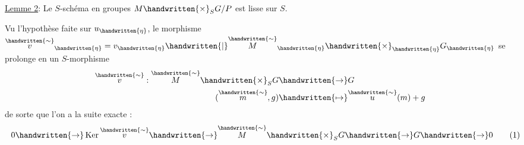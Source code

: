 \uline{Lemme 2}: Le $S$-schéma en groupes $M\handwritten{\times}_S G/P$  est lisse sur $S$.

Vu l'hypothèse faite sur $u_{\handwritten{\eta}}$, le morphisme $\overset{\handwritten{\sim}}{v}_{\handwritten{\eta}}=v_{\handwritten{\eta}}\handwritten{\mid}\overset{\handwritten{\sim}}{M}_{\handwritten{\eta}}\handwritten{\times}_{\handwritten{\eta}}G_{\handwritten{\eta}}$ se prolonge en un $S$-morphisme
\[
\begin{aligned}
\overset{\handwritten{\sim}}{v}:\overset{\handwritten{\sim}}{M}\handwritten{\times}_S G&\handwritten{\to} G\\
(\overset{\handwritten{\sim}}{m},g)&\handwritten{\mapsto} \overset{\handwritten{\sim}}{u}(m)+g
\end{aligned}
\]
de sorte que l'on a la suite exacte :
\[
0\handwritten{\to}\operatorname{Ker}\overset{\handwritten{\sim}}{v}\handwritten{\to}\overset{\handwritten{\sim}}{M}\handwritten{\times}_S G\handwritten{\to} G\handwritten{\to}0 \tag*{\makebox[0pt][r]{\makebox[\displaywidth][l]{(1)}}}
\]
\margin{\handwritten{$\checkmark$}}
